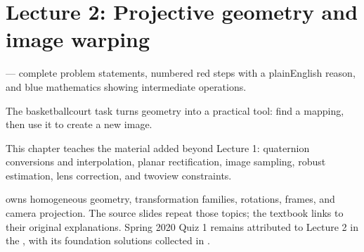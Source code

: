 \documentclass[letterpaper,11pt,english,openany,oneside]{jupyterBook}
\begin{document}
\par

\par\medskip

\sphinxstepscope


\chapter{Lecture 2: Projective geometry and image warping}
\label{\detokenize{lectures/lecture02/index:lecture-2-projective-geometry-and-image-warping}}\label{\detokenize{lectures/lecture02/index:lecture02}}\label{\detokenize{lectures/lecture02/index::doc}}
\sphinxAtStartPar
{} — complete problem statements, numbered red steps with a plain\sphinxhyphen{}English reason, and blue mathematics showing intermediate operations.

\sphinxAtStartPar
{} The basketball\sphinxhyphen{}court task turns geometry into a practical tool: find a mapping, then use it to create a new image.

\sphinxAtStartPar
This chapter teaches the material added beyond Lecture 1: quaternion conversions and interpolation, planar rectification, image sampling, robust estimation, lens correction, and two\sphinxhyphen{}view constraints.

\sphinxAtStartPar
{} {\hyperref[\detokenize{lectures/lecture01/index::doc}]{}} owns homogeneous geometry, transformation families, rotations, frames, and camera projection. The source slides repeat those topics; the textbook links to their original explanations. Spring 2020 Quiz 1 remains attributed to Lecture 2 in the {\hyperref[\detokenize{reference/quiz-index::doc}]{}}, with its foundation solutions collected in {\hyperref[\detokenize{lectures/lecture01/quiz-practice::doc}]{}}.
\end{document}
